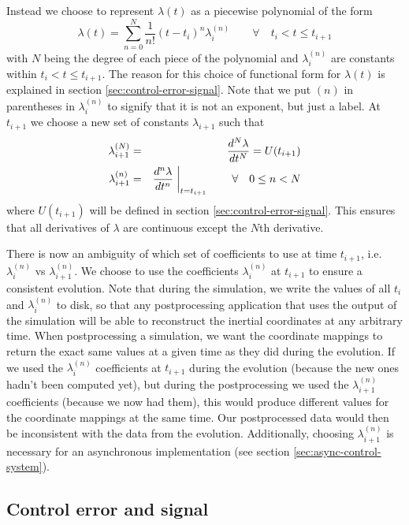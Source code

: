 \begin{bibunit}[unsrtnat]
Instead we choose to represent $\lambda(t)$
as a piecewise polynomial of the form
\begin{equation}
  \label{eq:lambda}
  \lambda(t) = \sum_{n=0}^{N}\frac{1}{n!}(t-t_{i})^n\lambda_{i}^{(n)}
    \quad\quad\forall\quad t_{i} < t \leq t_{i+1}
\end{equation}
with $N$ being the degree of each piece of the polynomial and
$\lambda_{i}^{(n)}$ are constants within $t_{i} < t \leq t_{i+1}$. The reason
for this choice of functional form for $\lambda(t)$ is explained in section
\ref{sec:control-error-signal}. Note that we put $(n)$ in parentheses in
$\lambda_{i}^{(n)}$ to signify that it is not an exponent, but just a label. At
$t_{i+1}$ we choose a new set of constants $\lambda_{i+1}$ such that
\begin{eqnarray}
  \label{eq:lambda-i-N}
  \lambda_{i+1}^{(N)} &=& \frac{d^{N}\lambda}{dt^{N}} = U(t_{i+1}) \\
  \label{eq:lambda-i-n}
  \lambda_{i+1}^{(n)} &=&
    \frac{d^{n}\lambda}{dt^{n}}\biggm|_{t=t_{i+1}}\quad\quad\forall\quad0 \leq n
    < N
\end{eqnarray}
where $U(t_{i+1})$ will be defined in section \ref{sec:control-error-signal}.
This ensures that all derivatives of $\lambda$ are continuous except the $N$th
derivative.

There is now an ambiguity of which set of coefficients to use at time $t_{i+1}$,
i.e.~$\lambda_i^{(n)}$ vs $\lambda_{i+1}^{(n)}$. We choose to use the
coefficients $\lambda_i^{(n)}$ at $t_{i+1}$ to ensure a consistent evolution.
Note that during the simulation, we write the values of all $t_{i}$ and
$\lambda_i^{(n)}$ to disk, so that any postprocessing application that uses the
output of the simulation will be able to reconstruct the inertial coordinates at
any arbitrary time. When postprocessing a simulation, we want the coordinate
mappings to return the exact same values at a given time as they did during the
evolution. If we used the $\lambda_i^{(n)}$ coefficients at $t_{i+1}$ during the
evolution (because the new ones hadn't been computed yet), but during the
postprocessing we used the $\lambda_{i+1}^{(n)}$ coefficients (because we now
had them), this would produce different values for the coordinate mappings at
the same time. Our postprocessed data would then be inconsistent with the data
from the evolution. Additionally, choosing $\lambda_{i+1}^{(n)}$ is necessary
for an asynchronous implementation (see section \ref{sec:async-control-system}).

\subsection{Control error and signal\label{sec:control-error-signal}}


\end{bibunit}

